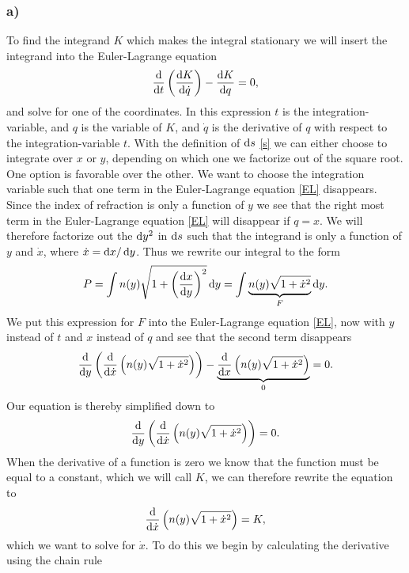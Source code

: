 \documentclass[12pt,twoside]{article}
\begin{document}
\subsubsection*{a)}
To find the integrand $K$ which makes the integral stationary we will insert the integrand into the Euler-Lagrange equation
\begin{equation}
  \dv{}{t}\left( \dv{K}{\dot{q}} \right) - \dv{K}{q} = 0, \label{EL}
\end{equation}
and solve for one of the coordinates. In this expression $t$ is the integration-variable, and $q$ is the variable of $K$, and $\dot{q}$ is the derivative of $q$ with respect to the integration-variable $t$. With the definition of $\dif s$ \eqref{s} we can either choose to integrate over $x$ or $y$, depending on which one we factorize out of the square root. One option is favorable over the other. We want to choose the integration variable such that one term in the Euler-Lagrange equation \eqref{EL} disappears. Since the index of refraction is only a function of $y$ we see that the right most term in the Euler-Lagrange equation \eqref{EL} will disappear if $q=x$. We will therefore factorize out the $\dif y^2$ in $\dif s$ such that the integrand is only a function of $y$ and $\dot{x}$, where $\dot{x}=\dif x/\dif y$.
Thus we rewrite our integral to the form
\begin{equation}
  P = \int n(y) \sqrt{1+\left(\frac{\dif x}{\dif y}\right)^2} \dif y = \int \underbrace{n(y) \sqrt{1+\dot{x}^2}}_{F} \dif y.
\end{equation}
We put this expression for $F$ into the Euler-Lagrange equation \eqref{EL}, now with $y$ instead of $t$ and $x$ instead of $q$ and see that the second term disappears
\begin{equation}
  \dv{}{y}\left(\dv{}{\dot{x}}\left( n(y) \sqrt{1+\dot{x}^2} \right)\right) - \underbrace{\dv{}{x}\left(n(y) \sqrt{1+\dot{x}^2}\right)}_0 = 0. \label{EL_2}
\end{equation}
Our equation is thereby simplified down to
\begin{equation}
  \dv{}{y}\left(\dv{}{\dot{x}}\left( n(y) \sqrt{1+\dot{x}^2} \right)\right) = 0.
\end{equation}
When the derivative of a function is zero we know that the function must be equal to a constant, which we will call $K$, we can therefore rewrite the equation to
\begin{equation}
  \dv{}{\dot{x}}\left( n(y) \sqrt{1+\dot{x}^2}\right) = K,
\end{equation}
which we want to solve for $\dot{x}$. To do this we begin by calculating the derivative using the chain rule
\end{document}

